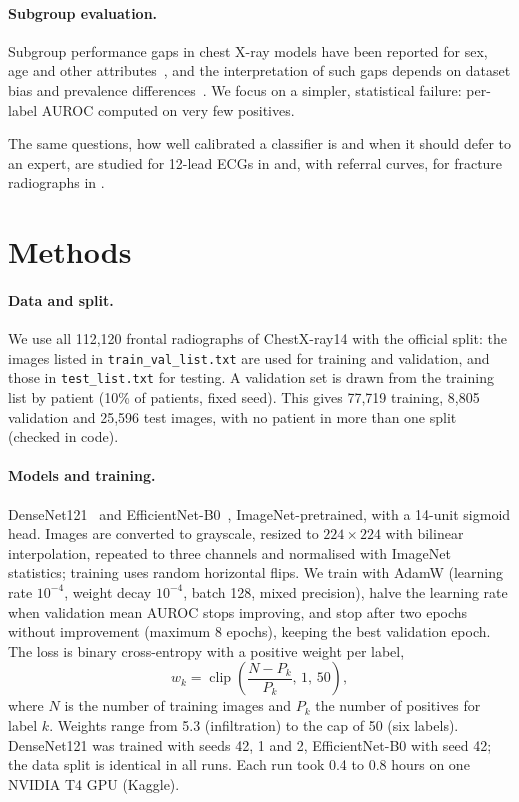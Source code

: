 \documentclass[11pt]{article}
\begin{document}
\paragraph{Subgroup evaluation.} Subgroup performance gaps in chest X-ray models have been reported for sex, age and other attributes~\cite{seyyedkalantari2021underdiagnosis}, and the interpretation of such gaps depends on dataset bias and prevalence differences~\cite{bernhardt2022potential}. We focus on a simpler, statistical failure: per-label AUROC computed on very few positives.

The same questions, how well calibrated a classifier is and when it should defer to an expert, are studied for 12-lead ECGs in \cite{hussain2026ptbxl} and, with referral curves, for fracture radiographs in \cite{hussain2026fracatlas}.

\section{Methods}
\label{sec:methods}

\paragraph{Data and split.} We use all 112,120 frontal radiographs of ChestX-ray14 with the official split: the images listed in \texttt{train\_val\_list.txt} are used for training and validation, and those in \texttt{test\_list.txt} for testing. A validation set is drawn from the training list by patient (10\% of patients, fixed seed). This gives 77,719 training, 8,805 validation and 25,596 test images, with no patient in more than one split (checked in code).

\paragraph{Models and training.} DenseNet121~\cite{huang2017densenet} and EfficientNet-B0~\cite{tan2019efficientnet}, ImageNet-pretrained, with a 14-unit sigmoid head. Images are converted to grayscale, resized to $224\times224$ with bilinear interpolation, repeated to three channels and normalised with ImageNet statistics; training uses random horizontal flips. We train with AdamW (learning rate $10^{-4}$, weight decay $10^{-4}$, batch 128, mixed precision), halve the learning rate when validation mean AUROC stops improving, and stop after two epochs without improvement (maximum 8 epochs), keeping the best validation epoch. The loss is binary cross-entropy with a positive weight per label,
\begin{equation}
  w_k = \operatorname{clip}\!\left(\frac{N - P_k}{P_k},\, 1,\, 50\right),
\end{equation}
where $N$ is the number of training images and $P_k$ the number of positives for label $k$. Weights range from 5.3 (infiltration) to the cap of 50 (six labels). DenseNet121 was trained with seeds 42, 1 and 2, EfficientNet-B0 with seed 42; the data split is identical in all runs. Each run took 0.4 to 0.8 hours on one NVIDIA T4 GPU (Kaggle).
\end{document}
